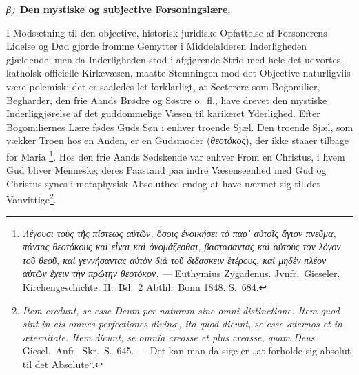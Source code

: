 \documentclass[12pt]{book}
\newcommand{\greekrun}[2]{%
  \medskip\begin{center}{\itshape #1)}\ {\bfseries #2}\end{center}\medskip}
\begin{document}
\greekrun{β}{Den mystiske og subjective Forsoningslære.}

I Modsætning til den objective, historisk-juridiske Opfattelse af
Forsonerens Lidelse og Død gjorde fromme Gemytter i Middelalderen
Inderligheden gjældende; men da Inderligheden stod i afgjørende
Strid med hele det udvortes, katholsk-officielle Kirkevæsen, maatte
Stemningen mod det Objective naturligviis være polemisk; det er
saaledes let forklarligt, at Secterere som Bogomilier, Begharder,
den frie Aands Brødre og Søstre o.\ fl., have drevet den mystiske
Inderliggjørelse af det guddommelige Væsen til karikeret Yderlighed.
Efter Bogomiliernes Lære fødes Guds Søn i enhver troende Sjæl. Den
troende Sjæl, som vækker Troen hos en Anden, er en Gudsmoder
(\textit{θεοτόκος}), der ikke staaer tilbage for
Maria%
\footnote{\textit{Λέγουσι τοὺς τῆς πίστεως αὐτῶν, ὅσοις ἐνοικήσει τὸ
παρ᾽ αὐτοῖς ἅγιον πνεῦμα, πάντας θεοτόκους καὶ εἶναι καὶ
ὀνομάζεσθαι, βαστασαντας καὶ αὐτοὺς τὸν λόγον τοῦ θεοῦ, καὶ
γεννήσαντας αὐτὸν διὰ τοῦ διδασκειν ἑτέρους, καὶ μηδὲν πλέον αὐτῶν
ἔχειν τὴν πρώτην θεοτόκον.} --- Euthymius Zygadenus. Jvnfr.\
Gieseler. Kirchengeschichte. II.\ Bd.\ 2 Abthl.\ Bonn 1848.
S.\ 684.}. Hos den frie Aands Sødskende var enhver From en Christus,
i hvem Gud bliver Menneske; deres Paastand paa indre Væsenseenhed
med Gud og Christus synes i metaphysisk Absoluthed endog at have
nærmet sig til det
Vanvittige\footnote{\textit{Item credunt, se esse Deum per naturam
sine omni distinctione. Item quod sint in eis omnes perfectiones
divinæ, ita quod dicunt, se esse æternos et in æternitate. Item
dicunt, se omnia creasse et plus creasse, quam Deus.} Giesel.\
Anfr.\ Skr.\ S.\ 645. --- Det kan man da sige er „at forholde sig
absolut til det Absolute“.}.
\end{document}
